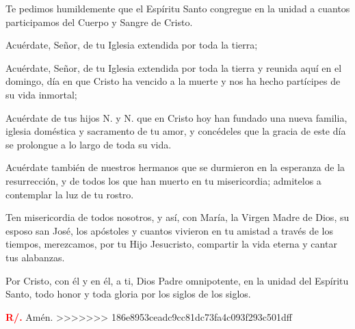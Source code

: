 \documentclass[12pt, letterpaper, spanish]{report}
\begin{document}
Te pedimos humildemente
que el Espíritu Santo congregue en la unidad
a cuantos participamos
del Cuerpo y Sangre de Cristo.

Acuérdate, Se\~nor,
de tu Iglesia extendida por toda la tierra;

Acuérdate, Se\~nor, de tu Iglesia 
extendida por toda la tierra 
y reunida aquí en el domingo, 
día en que Cristo ha vencido a la muerte 
y nos ha hecho partícipes de su vida inmortal;

Acuérdate de tus hijos N. y N. 
que en Cristo hoy han fundado una nueva familia, 
iglesia doméstica y sacramento de tu amor, 
y concédeles que la gracia de este día 
se prolongue a lo largo de toda su vida.


Acuérdate también de nuestros hermanos
que se durmieron en la esperanza
de la resurrecci\'on,
y de todos los que han muerto en tu misericordia;
admitelos a contemplar la luz de tu rostro.

Ten misericordia de todos nosotros,
y así, con María, la Virgen Madre de Dios,
su esposo san José,
los ap\'ostoles
y cuantos vivieron en tu amistad
a través de los tiempos,
merezcamos, por tu Hijo Jesucristo,
compartir la vida eterna
y cantar tus alabanzas.

Por Cristo, con él y en él,
a ti, Dios Padre omnipotente,
en la unidad del Espíritu Santo,
todo honor y toda gloria
por los siglos de los siglos. \newline

\Large \textcolor{red}{\bfseries R/.} \hspace{0.5cm} Am\'en. \newline
>>>>>>> 186e8953ceadc9cc81dc73fa4c093f293c501dff

\end{document}
